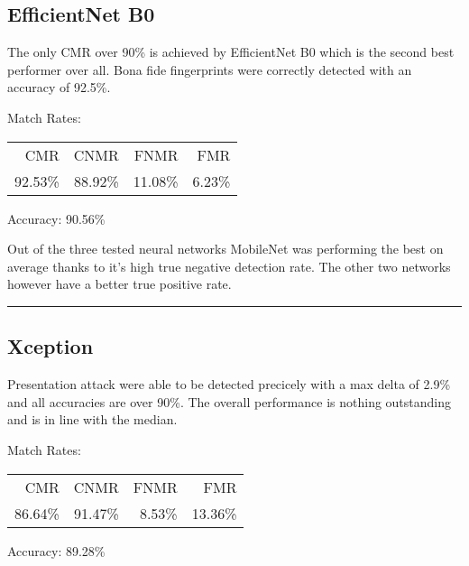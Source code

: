 \subsection{EfficientNet B0}
\begin{minipage}[c]{0.7\textwidth}

    The only CMR over 90\% is achieved by EfficientNet B0 which is the second best performer over all.
    Bona fide fingerprints were correctly detected with an accuracy of 92.5\%.
    
    \medskip\centering Match Rates: 
    \begin{tabular}{ r  r  r  r |}
        CMR     & CNMR          & FNMR                 & FMR     \\
        92.53\% & 88.92\%       & 11.08\%              & 6.23\%  \\
    \end{tabular} \hspace{2mm} Accuracy: 90.56\%
\end{minipage}
\hfill
\begin{minipage}[c]{0.3\textwidth}
    \centering
    
\end{minipage}

\medskip
Out of the three tested neural networks MobileNet was performing the best on average thanks to it's high true negative detection rate.
The other two networks however have a better true positive rate.
\bigskip\hrule



\subsection{Xception}
\begin{minipage}[c]{0.7\textwidth}
    Presentation attack were able to be detected precicely with a max delta of 2.9\% and all accuracies are over 90\%.
    The overall performance is nothing outstanding and is in line with the median.

    \medskip\centering Match Rates: 
    \begin{tabular}{ r  r  r  r |}
        CMR       & CNMR      & FNMR     & FMR     \\
        86.64\%   & 91.47\%   & 8.53\%   & 13.36\%  \\
    \end{tabular} \hspace{2mm} Accuracy: 89.28\%
\end{minipage}
\hfill
\begin{minipage}[c]{0.3\textwidth}
    \centering
    
\end{minipage}



